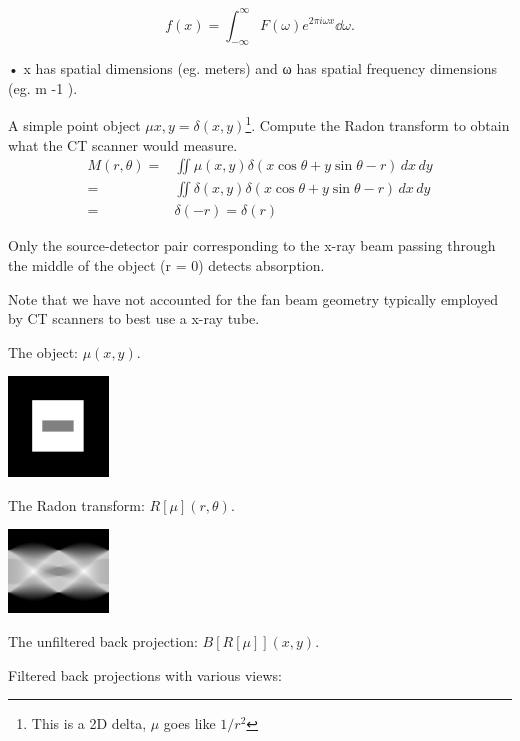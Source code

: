 \documentclass[UTF8,a4paper,11pt]{book}
\theoremstyle{mystyle}{
  \newtheorem{example}{Example}
}
\begin{document}
\begin{equation}
f(x) = \int_{-\infty}^{\infty} F(\omega) e^{2\pi i \omega x} \dd{\omega}.
\end{equation}

• x has spatial dimensions (eg. meters) and ω
has spatial frequency dimensions (eg. m -1 ).


\begin{example}
A simple point object $\mu{x,y}=\delta(x,y)$\footnote{This is a 2D delta, $\mu$ goes like $1/r^2$}.
Compute the Radon transform to obtain what
the CT scanner would measure.
\begin{align*}
M(r,\theta)
=  &
\iint \mu(x,y) \delta (x\cos\theta+y\sin\theta-r)\,dx\,dy  \\
=  &
\iint \delta(x,y) \delta (x\cos\theta+y\sin\theta-r)\,dx\,dy  \\
=  &
  \delta(-r)=\delta(r)
\end{align*}

 Only the source-detector pair corresponding
to the x-ray beam passing through the middle
of the object (r = 0) detects absorption.

Note that we have not accounted for the fan
beam geometry typically employed by CT
scanners to best use a x-ray tube.
\end{example}

\begin{example}
 The object: $\mu(x,y)$.
\begin{center}
\includegraphics[width=0.2\textwidth]{./fig/l7_ct_obj.jpg}
\end{center}
 

 The Radon transform: $R[\mu](r,\theta)$.
 \begin{center}
\includegraphics[width=0.2\textwidth]{./fig/l7_ct_rt.jpg}
\end{center}
 
 The unfiltered back projection: $B[R[\mu]](x,y)$.
 
 Filtered back projections with various views:
\end{example}
\end{document}
